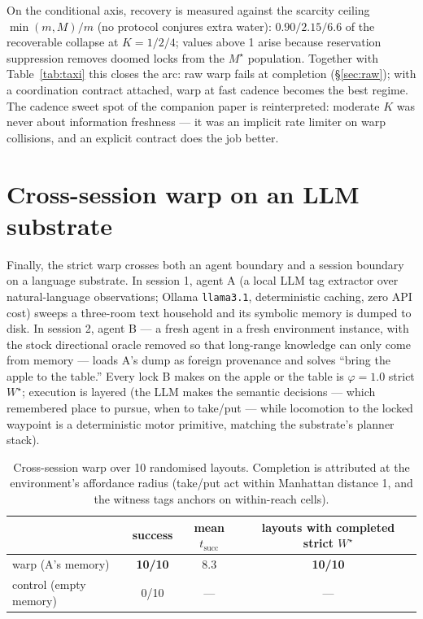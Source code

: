 \documentclass{article}
\newcommand{\method}[1]{\texttt{#1}}
\newcommand{\wstar}{W^{\star}}
\newcommand{\mstar}{M^{\star}}
\begin{document}
On the conditional axis, recovery is measured against the scarcity
ceiling $\min(m,M)/m$ (no protocol conjures extra water): $0.90 / 2.15
/ 6.6$ of the recoverable collapse at $K{=}1/2/4$; values above 1
arise because reservation suppression removes doomed locks from the
$\mstar$ population. Together with Table~\ref{tab:taxi} this closes
the arc: raw warp fails at completion (\S\ref{sec:raw}); with a
coordination contract attached, warp at fast cadence becomes the best
regime. The cadence sweet spot of the companion paper is
reinterpreted: moderate $K$ was never about information freshness ---
it was an implicit rate limiter on warp collisions, and an explicit
contract does the job better.

\section{Cross-session warp on an LLM substrate}
\label{sec:llm}

Finally, the strict warp crosses both an agent boundary and a session
boundary on a language substrate. In session 1, agent A (a local
LLM tag extractor over natural-language observations; Ollama
\method{llama3.1}, deterministic caching, zero API cost) sweeps a
three-room text household and its symbolic memory is dumped to disk.
In session 2, agent B --- a fresh agent in a fresh environment
instance, with the stock directional oracle removed so that long-range
knowledge can only come from memory --- loads A's dump as foreign
provenance and solves ``bring the apple to the table.'' Every lock B
makes on the apple or the table is $\varphi{=}1.0$ strict $\wstar$;
execution is layered (the LLM makes the semantic decisions --- which
remembered place to pursue, when to take/put --- while locomotion to
the locked waypoint is a deterministic motor primitive, matching the
substrate's planner stack).

\begin{table}[h]
\centering
\caption{Cross-session warp over 10 randomised layouts. Completion is
attributed at the environment's affordance radius (take/put act within
Manhattan distance 1, and the witness tags anchors on within-reach
cells).}
\label{tab:llm}
\small
\begin{tabular}{lccc}
\toprule
 & success & mean $t_{\text{succ}}$ & layouts with completed strict $\wstar$ \\
\midrule
warp (A's memory) & \textbf{10/10} & 8.3 & \textbf{10/10} \\
control (empty memory) & 0/10 & --- & --- \\
\bottomrule
\end{tabular}
\end{table}
\end{document}
